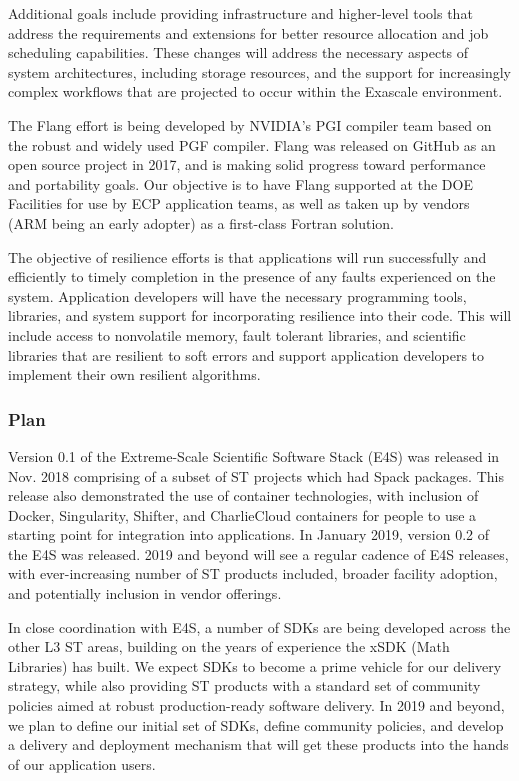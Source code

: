 Additional goals include providing infrastructure and higher-level tools that address the requirements and extensions for better resource allocation and job scheduling capabilities. These changes will address the necessary aspects of system architectures, including storage resources, and the support for increasingly complex workflows that are projected to occur within the Exascale environment. 

The Flang effort is being developed by NVIDIA's PGI compiler team based on the robust and widely used PGF compiler. Flang was released on GitHub as an open source project in 2017, and is making solid progress toward performance and portability goals. Our objective is to have Flang supported at the DOE Facilities for use by ECP application teams, as well as taken up by vendors (ARM being an early adopter) as a first-class Fortran solution.

The objective of resilience efforts is that applications will run successfully and efficiently to timely completion in the presence of any faults experienced on the system. Application developers will have the necessary programming tools, libraries, and system support for incorporating resilience into their code. This will include access to nonvolatile memory, fault tolerant libraries, and scientific libraries that are resilient to soft errors and support application developers to implement their own resilient algorithms.

\subsubsection{Plan}
Version 0.1 of the Extreme-Scale Scientific Software Stack (E4S) was released in Nov. 2018 comprising of a subset of ST projects which had Spack packages. This release also demonstrated the use of container technologies, with inclusion of Docker, Singularity, Shifter, and CharlieCloud containers for people to use a starting point for integration into applications. In January 2019, version 0.2 of the E4S was released. 2019 and beyond will see a regular cadence of E4S releases, with ever-increasing number of ST products included, broader facility adoption, and potentially inclusion in vendor offerings.

In close coordination with E4S, a number of SDKs are being developed across the other L3 ST areas, building on the years of experience the xSDK (Math Libraries) has built. We expect SDKs to become a prime vehicle for our delivery strategy, while also providing ST products with a standard set of community policies aimed at robust production-ready software delivery. In 2019 and beyond, we plan to define our initial set of SDKs, define community policies, and develop a delivery and deployment mechanism that will get these products into the hands of our application users.

